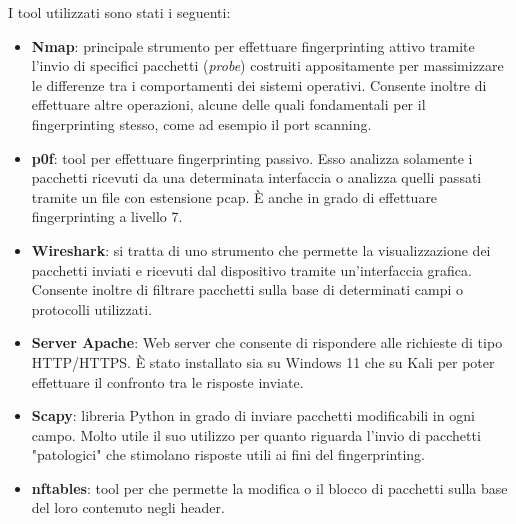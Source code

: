 I tool utilizzati sono stati i seguenti:
\begin{itemize}
	\item \textbf{Nmap}: principale strumento per effettuare fingerprinting attivo tramite l'invio di specifici pacchetti (\textit{probe}) costruiti appositamente per massimizzare le differenze tra i comportamenti dei sistemi operativi. Consente inoltre di effettuare altre operazioni, alcune delle quali fondamentali per il fingerprinting stesso, come ad esempio il port scanning.
	\item \textbf{p0f}: tool per effettuare fingerprinting passivo. Esso analizza solamente i pacchetti ricevuti da una determinata interfaccia o analizza quelli passati tramite un file con estensione pcap. È anche in grado di effettuare fingerprinting a livello 7.
	\item \textbf{Wireshark}: si tratta di uno strumento che permette la visualizzazione dei pacchetti inviati e ricevuti dal dispositivo tramite un'interfaccia grafica. Consente inoltre di filtrare pacchetti sulla base di determinati campi o protocolli utilizzati.
	\item \textbf{Server Apache}: Web server che consente di rispondere alle richieste di tipo HTTP/HTTPS. È stato installato sia su Windows 11 che su Kali per poter effettuare il confronto tra le risposte inviate.
	\item \textbf{Scapy}: libreria Python in grado di inviare pacchetti modificabili in ogni campo. Molto utile il suo utilizzo per quanto riguarda l'invio di pacchetti "patologici" che stimolano risposte utili ai fini del fingerprinting.
	\item \textbf{nftables}: tool per che permette la modifica o il blocco di pacchetti sulla base del loro contenuto negli header.
\end{itemize}

	






